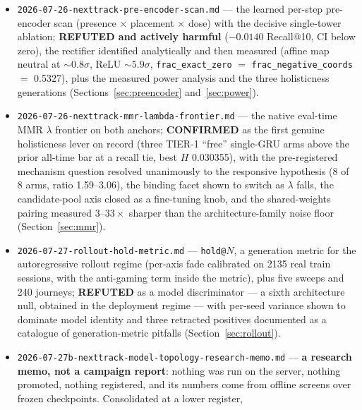 \documentclass[11pt]{article}
\begin{document}
\begin{itemize}
    \texttt{delta}/\texttt{cummean}, the MLP fusion head shown actively harmful,
    single-GRU width closed on PCA-192, and holisticness/recall shown
    anti-correlated across the batch (Section~\ref{sec:dualtower}).
  \item \texttt{2026-07-26-nexttrack-pre-encoder-scan.md} --- the learned
    per-step pre-encoder scan (presence $\times$ placement $\times$ dose) with
    the decisive single-tower ablation; \textbf{REFUTED and actively harmful}
    ($-\num{0.0140}$ Recall@10, CI below zero), the rectifier identified
    analytically and then measured (affine map neutral at ${\sim}0.8\sigma$, ReLU
    ${\sim}5.9\sigma$, \texttt{frac\_exact\_zero} $=$
    \texttt{frac\_negative\_coords} $=$ \num{0.5327}), plus the measured power
    analysis and the three holisticness generations
    (Sections~\ref{sec:preencoder} and~\ref{sec:power}).
  \item \texttt{2026-07-26-nexttrack-mmr-lambda-frontier.md} --- the native
    eval-time MMR $\lambda$ frontier on both anchors; \textbf{CONFIRMED} as the
    first genuine holisticness lever on record (three TIER-1 ``free'' single-GRU
    arms above the prior all-time bar at a recall tie, best $H$ \num{0.030355}),
    with the pre-registered mechanism question resolved unanimously to the
    responsive hypothesis (8 of 8 arms, ratio \numrange{1.59}{3.06}), the binding
    facet shown to switch as $\lambda$ falls, the candidate-pool axis closed as a
    fine-tuning knob, and the shared-weights pairing measured
    $\numrange{3}{33}\times$ sharper than the architecture-family noise floor
    (Section~\ref{sec:mmr}).
  \item \texttt{2026-07-27-rollout-hold-metric.md} --- \texttt{hold@}$N$, a
    generation metric for the autoregressive rollout regime (per-axis fade
    calibrated on \num{2135} real train sessions, with the anti-gaming term inside
    the metric), plus five sweeps and \num{240} journeys; \textbf{REFUTED} as a
    model discriminator --- a sixth architecture null, obtained in the deployment
    regime --- with per-seed variance shown to dominate model identity and three
    retracted positives documented as a catalogue of generation-metric pitfalls
    (Section~\ref{sec:rollout}).
  \item \texttt{2026-07-27b-nexttrack-model-topology-research-memo.md} ---
    \textbf{a research memo, not a campaign report}: nothing was run on the
    server, nothing promoted, nothing registered, and its numbers come from
    offline screens over frozen checkpoints. Consolidated at a lower register,

\end{itemize}
\end{document}
